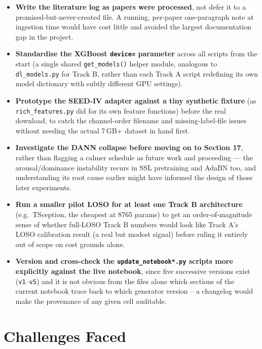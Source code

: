 \documentclass[11pt]{report}
\begin{document}
\begin{itemize}
  \item \textbf{Write the literature log as papers were processed}, not
        defer it to a promised-but-never-created file. A running,
        per-paper one-paragraph note at ingestion time would have cost
        little and avoided the largest documentation gap in the project.
  \item \textbf{Standardise the XGBoost \texttt{device=} parameter} across
        all scripts from the start (a single shared \texttt{get\_models()}
        helper module, analogous to \texttt{dl\_models.py} for Track B,
        rather than each Track A script redefining its own model dictionary
        with subtly different GPU settings).
  \item \textbf{Prototype the SEED-IV adapter against a tiny synthetic
        fixture} (as \texttt{rich\_features.py} did for its own feature
        functions) before the real download, to catch the channel-order
        filename and missing-label-file issues without needing the actual
        7\,GB+ dataset in hand first.
  \item \textbf{Investigate the DANN collapse before moving on to Section
        17}, rather than flagging a calmer schedule as future work and
        proceeding --- the arousal/dominance instability recurs in SSL
        pretraining and AdaBN too, and understanding its root cause earlier
        might have informed the design of those later experiments.
  \item \textbf{Run a smaller pilot LOSO for at least one Track B
        architecture} (e.g.\ TSception, the cheapest at 8765 params) to get
        an order-of-magnitude sense of whether full-LOSO Track B numbers
        would look like Track A's LOSO calibration result (a real but modest
        signal) before ruling it entirely out of scope on cost grounds
        alone.
  \item \textbf{Version and cross-check the \texttt{update\_notebook*.py}
        scripts more explicitly against the live notebook}, since five
        successive versions exist (\texttt{v1}--\texttt{v5}) and it is not
        obvious from the files alone which sections of the current notebook
        trace back to which generator version -- a changelog would make the
        provenance of any given cell auditable.
\end{itemize}

\chapter{Challenges Faced}
\label{ch:challenges}
\end{document}
